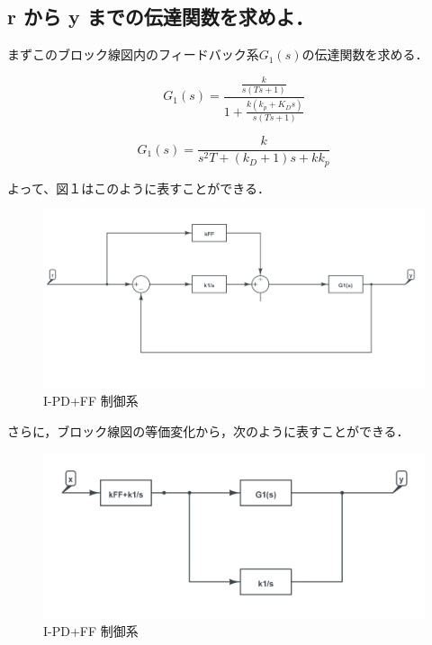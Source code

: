 \documentclass[xelatex,ja=standard,jafont=noto]{bxjsarticle}
\numberwithin{figure}{section}
\begin{document}
\subsection{r から y までの伝達関数を求めよ．}
まずこのブロック線図内のフィードバック系$ G_{1}(s) $の伝達関数を求める．

\begin{equation}
    G_{1}(s)=\frac{\frac{k}{s(Ts+1)}}{1+\frac{k(k_{p}+K_{D}s)}{s(Ts+1)}}
\end{equation}

\begin{equation}
    G_{1}(s)=\frac{k}{s^{2}T+(k_{D}+1)s+kk_{p}}
\end{equation}

よって、図１はこのように表すことができる．

\begin{figure}[h!]
    \centering
    \includegraphics[scale=0.4]{012.png}
    \caption{I-PD+FF 制御系 }
\end{figure}

さらに，ブロック線図の等価変化から，次のように表すことができる．

\newpage

\begin{figure}[h!]
    \centering
    \includegraphics[scale=0.4]{013.png}
    \caption{I-PD+FF 制御系 }
\end{figure}
\end{document}
